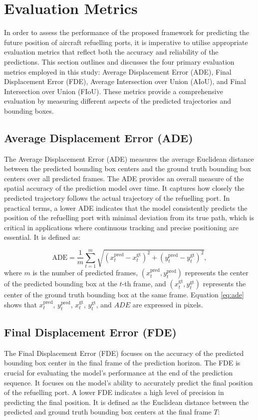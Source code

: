 \documentclass[12pt,oneside]{book} %
\begin{document}
\section{Evaluation Metrics}
In order to assess the performance of the proposed framework for predicting the
future position of aircraft refuelling ports, it is imperative to utilise
appropriate evaluation metrics that reflect both the accuracy and reliability
of the predictions. This section outlines and discusses the four primary
evaluation metrics employed in this study: Average Displacement Error (ADE),
Final Displacement Error (FDE), Average Intersection over Union (AIoU), and
Final Intersection over Union (FIoU). These metrics provide a comprehensive
evaluation by measuring different aspects of the predicted trajectories and
bounding boxes.

\subsection*{Average Displacement Error (ADE)}
\noindent The Average Displacement Error (ADE) measures the average Euclidean distance between the predicted bounding box centers and the ground truth bounding box centers over all predicted frames. The ADE provides an overall measure of the spatial accuracy of the prediction model over time. It captures how closely the predicted trajectory follows the actual trajectory of the refuelling port. In practical terms, a lower ADE indicates that the model consistently predicts the position of the refuelling port with minimal deviation from its true path, which is critical in applications where continuous tracking and precise positioning are essential. It is defined as:

\begin{equation}
    \text{ADE} = \frac{1}{m} \sum_{t=1}^{m} \sqrt{(x_t^{\text{pred}} - x_t^{\text{gt}})^2 + (y_t^{\text{pred}} - y_t^{\text{gt}})^2}, \label{eq:ade}
\end{equation}
where \(m\) is the number of predicted frames, \((x_t^{\text{pred}},
y_t^{\text{pred}})\) represents the center of the predicted bounding box at the
\(t\)-th frame, and \((x_t^{\text{gt}}, y_t^{\text{gt}})\) represents the
center of the ground truth bounding box at the same frame. Equation
\eqref{eq:ade} shows that \(x_t^{\text{pred}}\), \(y_t^{\text{pred}}\),
\(x_t^{\text{gt}}\), \(y_t^{\text{gt}}\), and \(ADE\) are expressed in pixels.

\subsection*{Final Displacement Error (FDE)}
\noindent The Final Displacement Error (FDE) focuses on the accuracy of the predicted bounding box center in the final frame of the prediction horizon. The FDE is crucial for evaluating the model’s performance at the end of the prediction sequence. It focuses on the model’s ability to accurately predict the final position of the refuelling port. A lower FDE indicates a high level of precision in predicting the final position. It is defined as the Euclidean distance between the predicted and ground truth bounding box centers at the final frame \(T\):
\end{document}
